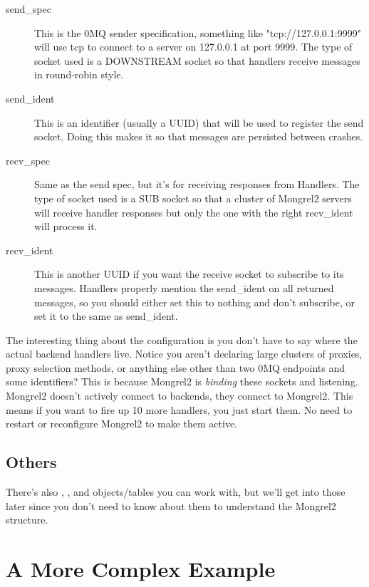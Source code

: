 \begin{description}
\item[send\_spec]  This is the 0MQ sender specification, something like "tcp://127.0.0.1:9999" will
    use tcp to connect to a server on 127.0.0.1 at port 9999.  The type of socket used is a DOWNSTREAM
    socket so that handlers receive messages in round-robin style.
\item[send\_ident] This is an identifier (usually a UUID) that will be used to register the send
    socket.  Doing this makes it so that messages are persisted between crashes.
\item[recv\_spec] Same as the send spec, but it's for receiving responses from Handlers.  The type of
    socket used is a SUB socket so that a cluster of Mongrel2 servers will receive handler responses
    but only the one with the right recv\_ident will process it.
\item[recv\_ident] This is another UUID if you want the receive socket to subscribe to its messages.
    Handlers properly mention the send\_ident on all returned messages, so you should either set this
    to nothing and don't subscribe, or set it to the same as send\_ident.
\end{description}

The interesting thing about the  configuration is you don't have to say where the
actual backend handlers live.  Notice you aren't declaring large clusters of proxies, proxy selection
methods, or anything else other than two 0MQ endpoints and some identifiers?  This is because Mongrel2 is
\emph{binding} these sockets and listening.  Mongrel2 doesn't actively connect to backends, they connect
to Mongrel2.  This means if you want to fire up 10 more handlers, you just start them.  No need to restart
or reconfigure Mongrel2 to make them active.


\subsection{Others}

There's also , , and  objects/tables you can work
with, but we'll get into those later since you don't need to know about them to understand
the Mongrel2 structure.



\section{A More Complex Example}


